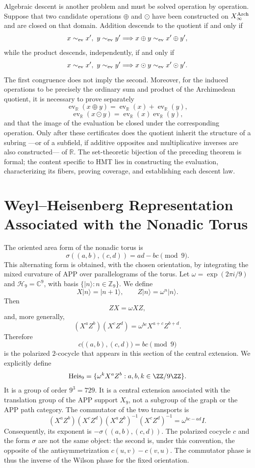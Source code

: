 Algebraic descent is another problem and must be solved operation by
operation. Suppose that two candidate operations
\(\oplus\) and \(\odot\) have been constructed on \(X_\infty^{\rm Arch}\) and are closed on that
domain. Addition descends to the quotient if and only if
\[
x\sim_{\rm ev}x',\ y\sim_{\rm ev}y'
\Longrightarrow
x\oplus y\sim_{\rm ev}x'\oplus y',
\]
while the product descends, independently, if and only if
\[
x\sim_{\rm ev}x',\ y\sim_{\rm ev}y'
\Longrightarrow
x\odot y\sim_{\rm ev}x'\odot y'.
\]
The first congruence does not imply the second. Moreover, for the induced operations
to be precisely the ordinary sum and product of the Archimedean quotient, it is necessary to prove separately
\[
\operatorname{ev}_{\mathbb R}(x\oplus y)
=\operatorname{ev}_{\mathbb R}(x)+\operatorname{ev}_{\mathbb R}(y),
\]
\[
\operatorname{ev}_{\mathbb R}(x\odot y)
=\operatorname{ev}_{\mathbb R}(x)\operatorname{ev}_{\mathbb R}(y),
\]
and that the image of the evaluation be closed under the corresponding operation.
Only after these certificates does the quotient inherit the structure of a
subring ---or of a subfield, if additive opposites and multiplicative inverses are also constructed---
of \(\mathbb R\). The set-theoretic bijection of the preceding theorem is formal;
the content specific to HMT lies in constructing the evaluation, characterizing its
fibers, proving coverage, and establishing each descent law.

\section{Weyl--Heisenberg Representation Associated with the Nonadic Torus}

The oriented area form of the nonadic torus is
\[
\sigma((a,b),(c,d))=ad-bc\pmod9.
\]
This alternating form is obtained, with the chosen orientation, by
integrating the mixed curvature of APP over parallelograms of the torus. Let
\(\omega=\exp(2\pi i/9)\) and
\(\mathcal H_9=\mathbb C^9\), with basis \(\{|n\rangle:n\in\mathbb Z_9\}\).
We define
\[
X|n\rangle=|n+1\rangle,
\qquad
Z|n\rangle=\omega^n|n\rangle.
\]
Then
\[
ZX=\omega XZ,
\]
and, more generally,
\[
(X^aZ^b)(X^cZ^d)
=\omega^{bc}X^{a+c}Z^{b+d}.
\]
Therefore
\[
 c\bigl((a,b),(c,d)\bigr)=bc\pmod9
\]
is the polarized \(2\)-cocycle that appears in this section of the central
extension. We explicitly define
\[
 \operatorname{Heis}_9
 =\{\omega^kX^aZ^b:a,b,k\in\ZZ/9\ZZ\}.
\]
It is a group of order \(9^3=729\). It is a central extension associated
with the translation group of the APP support \(X_9\), not a subgroup of the
graph or the APP path category\@.
The commutator of the two transports is
\[
(X^aZ^b)(X^cZ^d)(X^aZ^b)^{-1}(X^cZ^d)^{-1}
=\omega^{bc-ad}I.
\]
Consequently, its exponent is \(-\sigma((a,b),(c,d))\). The polarized cocycle
\(c\) and the form \(\sigma\) are not the same object: the second is,
under this convention, the opposite of the antisymmetrization
\(c(u,v)-c(v,u)\). The commutator phase is thus the inverse of the
Wilson phase for the fixed orientation.

